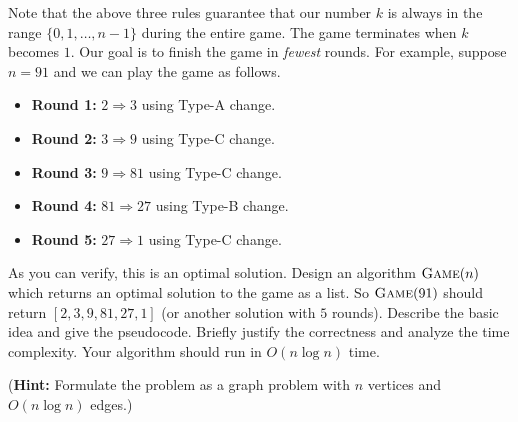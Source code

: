 \documentclass[letterpaper, 11pt]{article}
\newcommand{\1}{\mathds{1}}	%
\theoremstyle{definition}
\begin{document}
Note that the above three rules guarantee that our number $k$ is always in the range $\{0,1,\dots,n-1\}$ during the entire game.
The game terminates when $k$ becomes $1$.
Our goal is to finish the game in \textit{fewest} rounds.
For example, suppose $n = 91$ and we can play the game as follows.
\begin{itemize}
    \item \textbf{Round 1:} $2 \Longrightarrow 3$ using Type-A change.
    \item \textbf{Round 2:} $3 \Longrightarrow 9$ using Type-C change.    
    \item \textbf{Round 3:} $9 \Longrightarrow 81$ using Type-C change.
    \item \textbf{Round 4:} $81 \Longrightarrow 27$ using Type-B change.
    \item \textbf{Round 5:} $27 \Longrightarrow 1$ using Type-C change.    
\end{itemize}
As you can verify, this is an optimal solution.
Design an algorithm $\textsc{Game}(n)$ which returns an optimal solution to the game as a list.
So $\textsc{Game}(91)$ should return $[2,3,9,81,27,1]$ (or another solution with $5$ rounds).
Describe the basic idea and give the pseudocode.
Briefly justify the correctness and analyze the time complexity.
Your algorithm should run in $O(n \log n)$ time.

(\textbf{Hint:} Formulate the problem as a graph problem with $n$ vertices and $O(n \log n)$ edges.)
\end{document}
